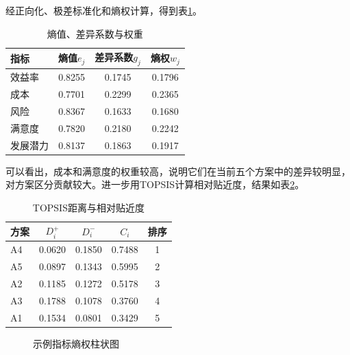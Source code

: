 \documentclass[UTF8,a4paper,12pt,fontset=none]{ctexart}
\begin{document}
经正向化、极差标准化和熵权计算，得到表\ref{tab:weights}。
\begin{table}[H]
\centering
\caption{熵值、差异系数与权重}
\label{tab:weights}
\begin{tabular}{lccc}
\toprule
指标 & 熵值$e_j$ & 差异系数$g_j$ & 熵权$w_j$\\
\midrule
效益率 & 0.8255 & 0.1745 & 0.1796\\
成本 & 0.7701 & 0.2299 & 0.2365\\
风险 & 0.8367 & 0.1633 & 0.1680\\
满意度 & 0.7820 & 0.2180 & 0.2242\\
发展潜力 & 0.8137 & 0.1863 & 0.1917\\
\bottomrule
\end{tabular}
\end{table}

可以看出，成本和满意度的权重较高，说明它们在当前五个方案中的差异较明显，对方案区分贡献较大。进一步用TOPSIS计算相对贴近度，结果如表\ref{tab:result}。

\begin{table}[H]
\centering
\caption{TOPSIS距离与相对贴近度}
\label{tab:result}
\begin{tabular}{lcccc}
\toprule
方案 & $D_i^+$ & $D_i^-$ & $C_i$ & 排序\\
\midrule
A4 & 0.0620 & 0.1850 & 0.7488 & 1\\
A5 & 0.0897 & 0.1343 & 0.5995 & 2\\
A2 & 0.1185 & 0.1272 & 0.5178 & 3\\
A3 & 0.1788 & 0.1078 & 0.3760 & 4\\
A1 & 0.1534 & 0.0801 & 0.3429 & 5\\
\bottomrule
\end{tabular}
\end{table}

\begin{figure}[H]
\centering
{}
\caption{示例指标熵权柱状图}
\end{figure}
\end{document}
